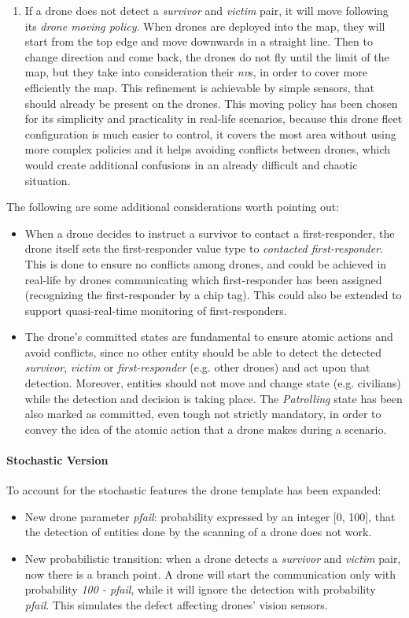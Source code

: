 \begin{enumerate}
\begin{enumerate}
		\item If a drone does not detect a \textit{survivor} and \textit{victim} pair, it will move following its \textit{drone moving policy}. When drones are deployed into the map, they will start from the top edge and move downwards in a straight line. Then to change direction and come back, the drones do not fly until the limit of the map, but they take into consideration their \textit{nv}s, in order to cover more efficiently the map. This refinement is achievable by simple sensors, that should already be present on the drones. This moving policy has been chosen for its simplicity and practicality in real-life scenarios, because this drone fleet configuration is much easier to control, it covers the most area without using more complex policies and it helps avoiding conflicts between drones, which would create additional confusions in an already difficult and chaotic situation.
	\end{enumerate}
\end{enumerate}
The following are some additional considerations worth pointing out:
\begin{itemize}
	\item 	When a drone decides to instruct a survivor to contact a first-responder, the drone itself sets the first-responder value type to \textit{contacted first-responder}. This is done to ensure no conflicts among drones, and could be achieved in real-life by drones communicating which first-responder has been assigned (recognizing the first-responder by a chip tag). This could also be extended to support quasi-real-time monitoring of first-responders.
	\item 	The drone's committed states are fundamental to ensure atomic actions and avoid conflicts, since no other entity should be able to detect the detected \textit{survivor}, \textit{victim} or \textit{first-responder} (e.g. other drones) and act upon that detection. Moreover, entities should not move and change state (e.g. civilians) while the detection and decision is taking place. The \textit{Patrolling} state has been also marked as committed, even tough not strictly mandatory, in order to convey the idea of the atomic action that a drone makes during a scenario.
\end{itemize}

\paragraph{Stochastic Version}
To account for the stochastic features the drone template has been expanded:
\begin{itemize}
	\item New drone parameter \textit{pfail}: probability expressed by an integer [0, 100], that the detection of entities done by the scanning of a drone does not work.
	\item New probabilistic transition: when a drone detects a \textit{survivor} and \textit{victim} pair, now there is a branch point. A drone will start the communication only with probability \textit{100 - pfail}, while it will ignore the detection with probability \textit{pfail}. This simulates the defect affecting drones' vision sensors.
\end{itemize}
